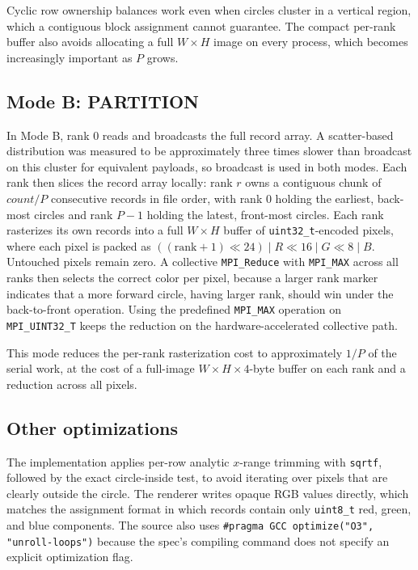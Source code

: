 \documentclass{article}
\begin{document}
Cyclic row ownership balances work even when circles cluster in a vertical region, which a contiguous block assignment cannot guarantee. The compact per-rank buffer also avoids allocating a full \(W \times H\) image on every process, which becomes increasingly important as \(P\) grows.

\subsection{Mode B: PARTITION}
In Mode B, rank 0 reads and broadcasts the full record array. A scatter-based distribution was measured to be approximately three times slower than broadcast on this cluster for equivalent payloads, so broadcast is used in both modes. Each rank then slices the record array locally: rank \(r\) owns a contiguous chunk of \(count/P\) consecutive records in file order, with rank 0 holding the earliest, back-most circles and rank \(P-1\) holding the latest, front-most circles. Each rank rasterizes its own records into a full \(W \times H\) buffer of \texttt{uint32\_t}-encoded pixels, where each pixel is packed as \( ((\mathrm{rank}+1) \ll 24) \;|\; R \ll 16 \;|\; G \ll 8 \;|\; B \). Untouched pixels remain zero. A collective \texttt{MPI\_Reduce} with \texttt{MPI\_MAX} across all ranks then selects the correct color per pixel, because a larger rank marker indicates that a more forward circle, having larger rank, should win under the back-to-front operation. Using the predefined \texttt{MPI\_MAX} operation on \texttt{MPI\_UINT32\_T} keeps the reduction on the hardware-accelerated collective path.

This mode reduces the per-rank rasterization cost to approximately \(1/P\) of the serial work, at the cost of a full-image \(W \times H \times 4\)-byte buffer on each rank and a reduction across all pixels.

\subsection{Other optimizations}
The implementation applies per-row analytic \(x\)-range trimming with \texttt{sqrtf}, followed by the exact circle-inside test, to avoid iterating over pixels that are clearly outside the circle. The renderer writes opaque RGB values directly, which matches the assignment format in which records contain only \texttt{uint8\_t} red, green, and blue components. The source also uses \texttt{\#pragma GCC optimize("O3", "unroll-loops")} because the spec's compiling command does not specify an explicit optimization flag.
\end{document}
